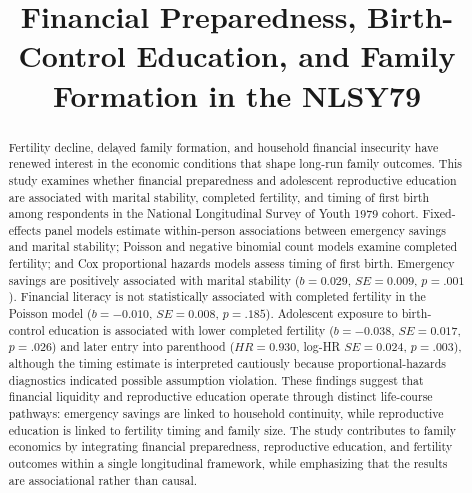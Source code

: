 \documentclass[12pt]{article}
\begin{document}
\title{Financial Preparedness, Birth-Control Education, and Family Formation in the NLSY79}
\author{}
\date{}
\maketitle
\pagebreak


\begin{abstract}
Fertility decline, delayed family formation, and household financial insecurity have renewed interest in the economic conditions that shape long-run family outcomes. This study examines whether financial preparedness and adolescent reproductive education are associated with marital stability, completed fertility, and timing of first birth among respondents in the National Longitudinal Survey of Youth 1979 cohort. Fixed-effects panel models estimate within-person associations between emergency savings and marital stability; Poisson and negative binomial count models examine completed fertility; and Cox proportional hazards models assess timing of first birth. Emergency savings are positively associated with marital stability ($b = 0.029$, $SE = 0.009$, $p = .001$). Financial literacy is not statistically associated with completed fertility in the Poisson model ($b = -0.010$, $SE = 0.008$, $p = .185$). Adolescent exposure to birth-control education is associated with lower completed fertility ($b = -0.038$, $SE = 0.017$, $p = .026$) and later entry into parenthood ($HR = 0.930$, log-HR $SE = 0.024$, $p = .003$), although the timing estimate is interpreted cautiously because proportional-hazards diagnostics indicated possible assumption violation. These findings suggest that financial liquidity and reproductive education operate through distinct life-course pathways: emergency savings are linked to household continuity, while reproductive education is linked to fertility timing and family size. The study contributes to family economics by integrating financial preparedness, reproductive education, and fertility outcomes within a single longitudinal framework, while emphasizing that the results are associational rather than causal.
\end{abstract}

\end{document}
